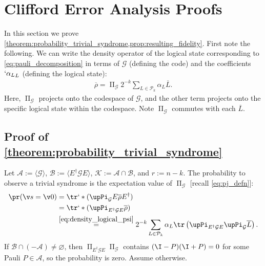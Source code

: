 \section{Clifford Error Analysis Proofs}
\label{sec:clifford_error_analysis_proofs}
In this section we prove \cref{theorem:probability_trivial_syndrome,prop:resulting_fidelity}.
First note the following.
We can write the density operator of
the logical state corresponding to \cref{eq:pauli_decomposition} in terms of
	$\mathcal G$ (defining the code)
	and the coefficients $`{\alpha_L}_L$ (defining the logical state):
\begin{align}
\overline{\rho}
=\upPi_{\mathcal G} 2^{-k} \sum_{L \in \mathcal{P}_k} \alpha_L \overline{L}.
\label{eq:density_logical_psi}
\end{align}
Here, $\upPi_{\mathcal G}$ projects onto the codespace of $\mathcal G$,
and the other term projects onto the specific logical state within the codespace.
Note $\upPi_{\mathcal G}$ commutes with each $\overline{L}$.

\subsection{Proof of \texorpdfstring
{\cref{theorem:probability_trivial_syndrome}}
{Theorem~\ref{theorem:probability_trivial_syndrome}}}
Let
$\mathcal A:=\langle\mathcal G\rangle$,
$\mathcal B:=\langle E^\dagger\mathcal G E\rangle$,
$\mathcal K:=\mathcal A\cap\mathcal B$,
and $r :=n-k$.
The probability to observe a trivial syndrome
is the expectation value of $\upPi_{\mathcal G}$
[recall \cref{eq:pj_defn}]:
\begin{align}
	\pr(\v s =\v 0)
	&=\tr`*(\upPi_{\mathcal G} E\overline{\rho} E^\dag) \notag \\
	&=\tr`*(\upPi_{E^\dag \mathcal G E} \overline{\rho}) \notag \\
	&\overset{\eqref{eq:density_logical_psi}}=
	2^{-k}\sum_{L\in\mathcal P_k}\alpha_L \tr\left(
	\upPi_{E^\dagger \mathcal G E}\upPi_{\mathcal G} \overline L
	\right).
	\label{eq:sum_of_traces_fully_expanded}
\end{align}
If $\mathcal B\cap(-\mathcal A)\ne\varnothing$,
then $\upPi_{E^\dagger \mathcal G E}\upPi_{\mathcal G}$
contains $(\I -P)(\I +P) =0$ for some Pauli $P \in \mathcal A$,
so the probability is zero.
Assume otherwise.

